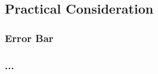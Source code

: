 \subsection{Practical Consideration}\label{subsec:correct-practical}

\subsubsection{Error Bar}\label{subsubsec:error-bar}


\subsubsection{...}